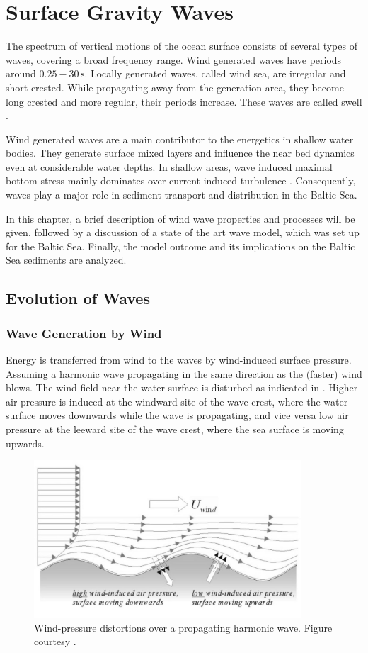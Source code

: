 \chapter{Surface Gravity Waves}
\label{kap-waves}
The spectrum of vertical motions of the ocean surface consists of several types 
of waves, covering a broad frequency range.  Wind generated 
waves have periods around $0.25 - 30\,\text{s}$. Locally generated waves, called 
wind sea, are irregular and short crested. While propagating away from the 
generation area, they become long crested and more regular, their periods 
increase. These waves are called swell \citep[][]{holthuijsen2007}. 

Wind generated waves are a main contributor to the energetics in shallow water 
bodies. They generate surface mixed layers and influence the near bed dynamics 
even at considerable water depths. In shallow areas, wave induced maximal 
bottom stress mainly dominates over current induced turbulence 
\citep[][]{jonsson2004}. Consequently, waves play a 
major role in sediment transport and distribution in the Baltic Sea.

In this chapter, a brief description of wind wave properties and processes will 
be given, followed by a discussion of a state of the art wave model, which was 
set up for the Baltic Sea. Finally, the model outcome and its implications on 
the Baltic Sea sediments are analyzed.

\section{Evolution of Waves}

\subsection{Wave Generation by Wind}
Energy is transferred from wind to the waves by wind-induced surface pressure. 
Assuming a harmonic wave propagating in the same direction as the (faster) wind 
blows. The wind field near the water surface is disturbed as indicated in 
. Higher air pressure is induced at the windward site of the wave 
crest, where the water surface moves downwards while the wave is propagating, 
and vice versa low air pressure at the leeward site of the wave crest, where 
the sea surface is moving upwards.
\begin{figure}[ht]

 \includegraphics[width=10cm]{bilder/windpressure_sw.png}
 \caption{Wind-pressure distortions over a propagating harmonic wave. Figure 
courtesy \cite{holthuijsen2007}. \label{windgen}}
\end{figure}

